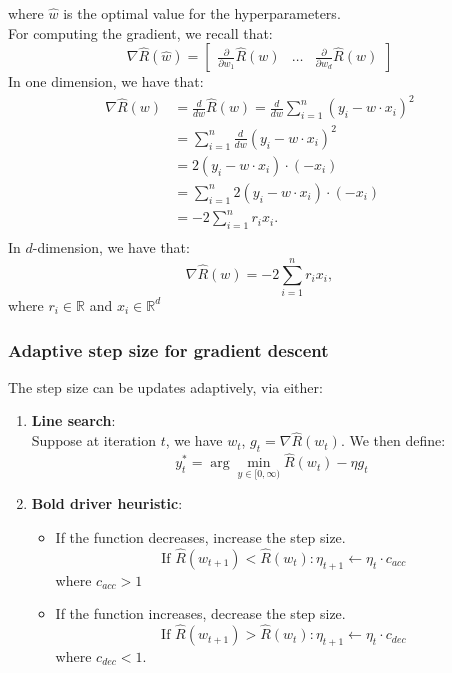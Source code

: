 \documentclass[a4paper,10pt,twoside]{article}
\begin{document}
where $\hat{w}$ is the optimal value for the hyperparameters.\\
For computing the gradient, we recall that:
\begin{equation*}
    \nabla\hat{R}(\hat{w}) = 
    \begin{bmatrix}
        \frac{\partial}{\partial w_1}\hat{R}(w) & \ldots & \frac{\partial}{\partial w_d}\hat{R}(w)
    \end{bmatrix}
\end{equation*}
In one dimension, we have that:
\begin{align*}
    \nabla\hat{R}(w) &= \frac{d}{dw}\hat{R}(w) = \frac{d}{dw}\sum_{i=1}^{n}(y_i-w\cdot x_i)^2\\
    &= \sum_{i=1}^{n}\frac{d}{dw}(y_i-w\cdot x_i)^2\\
    &=2(y_i-w\cdot x_i)\cdot(-x_i)\\
    &=\sum_{i=1}^{n}2(y_i-w\cdot x_i)\cdot(-x_i)\\
    &=-2\sum_{i=1}^{n}r_i x_i.\\
\end{align*}
In $d$-dimension, we have that:
\begin{equation*}
    \nabla\hat{R}(w)=-2\sum_{i=1}^{n}r_i x_i,
\end{equation*}
where $r_i\in\mathbb{R}$ and $x_i\in\mathbb{R}^d$

\subsubsection{Adaptive step size for gradient descent}

The step size can be updates adaptively, via either:
\begin{enumerate}
    \item \textbf{Line search}:\\
    Suppose at iteration $t$, we have $w_t$, $g_t=\nabla\hat{R}(w_t)$. We then define:
    \begin{equation*}
        y_t^{*} = \arg\min_{y\in[0,\infty)}\hat{R}(w_t)-\eta g_t
    \end{equation*}
    \item \textbf{Bold driver heuristic}:
    \begin{itemize}
        \item If the function decreases, increase the step size.
        \begin{equation*}
            \text{If }\hat{R}(w_{t+1})<\hat{R}(w_{t}): \eta_{t+1}\leftarrow\eta_{t}\cdot c_{acc}
        \end{equation*}
        where $c_{acc}>1$
        \item If the function increases, decrease the step size. 
        \begin{equation*}
            \text{If }\hat{R}(w_{t+1})>\hat{R}(w_{t}): \eta_{t+1}\leftarrow\eta_{t}\cdot c_{dec}
        \end{equation*}
        where $c_{dec}<1$.
    \end{itemize}
\end{enumerate}
\end{document}
